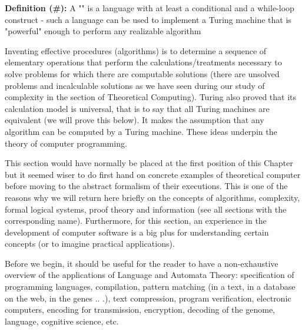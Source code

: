 	\textbf{Definition (\#\mydef):} A "" is a language with at least a conditional and a while-loop construct - such a language can be used to implement a Turing machine that is "powerful" enough to perform any realizable algorithm 
	
	Inventing effective procedures (algorithms) is to determine a sequence of elementary operations that perform the calculations/treatments necessary to solve problems for which there are computable solutions (there are unsolved problems and incalculable solutions as we have seen during our study of complexity in the section of Theoretical Computing). Turing also proved that its calculation model is universal, that is to say that all Turing machines are equivalent (we will prove this below). It makes the assumption that any algorithm can be computed by a Turing machine. These ideas underpin the theory of computer programming.
	
	\begin{tcolorbox}[title=Remark,colframe=black,arc=10pt]
	This section would have normally be placed at the first position of this Chapter but it seemed wiser to do first hand on concrete examples of theoretical computer before moving to the abstract formalism of their executions. This is one of the reasons why we will return here briefly on the concepts of algorithms, complexity, formal logical systems, proof theory and information (see all sections with the corresponding name). Furthermore, for this section, an experience in the development of computer software is a big plus for understanding certain concepts (or to imagine practical applications).
	\end{tcolorbox}
	Before we begin, it should be useful for the reader to have a non-exhaustive overview of the applications of Language and Automata Theory: specification of programming languages, compilation, pattern matching (in a text, in a database on the web, in the genes .. .), text compression, program verification, electronic computers, encoding for transmission, encryption, decoding of the genome, language, cognitive science, etc.
	
